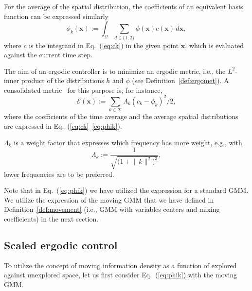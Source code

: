 \documentclass[letterpaper,10pt,conference,twoside]{IEEEtran}
\theoremstyle{definition}
\begin{document}
For the average of the spatial distribution, the coefficients of an equivalent basis function can be expressed similarly
\begin{equation}\label{eq:phik}
  \phi_k(\mathbf{x}):=\int_{\mathcal{Q}}{\sum_{d\in\{1,2\}}}{\phi(\mathbf{x})c(\mathbf{x})\,d\mathbf{x}},
\end{equation}
where $c$ is the integrand in Eq.~(\ref{eq:ck}) in the given point $\mathbf{x}$, which is evaluated against the current time step.

The aim of an ergodic controller is to minimize an ergodic metric, i.e., the $L^2$-inner product of the distributions $h$ and $\phi$ (see Definition~\ref{def:ergomet}). A consolidated metric~\cite{abraham2017ergodic,abraham2021ergodic,seewald2024energy,lerch2023safety,abraham2018decentralized,dong2023time} for this purpose is, for instance,
\begin{equation}
  \mathcal{E}(\mathbf{x}):=\sum_{k\in\mathcal{K}}{\Lambda_k(c_k-\phi_k)^2/2},
\end{equation}
where the coefficients of the time average and the average spatial distributions are expressed in Eq.~(\ref{eq:ck}--\ref{eq:phik}). 

$\Lambda_k$ is a weight factor that expresses which frequency has more weight, e.g., with %
\begin{equation}
  \Lambda_k:=\frac{1}{\sqrt{\big(1+\lVert{k}\rVert^2\big)^3}},
\end{equation}
lower frequencies are to be preferred.

Note that in Eq.~(\ref{eq:phik}) we have utilized the expression for a standard GMM. %
We utilize the expression of the moving GMM that we have defined in Definition~\ref{def:movement} (i.e., GMM with variables centers and mixing coefficients) in the next section.

\subsection{Scaled ergodic control}
\label{sec:sol}
\noindent
To utilize the concept of moving information density as a function of explored against unexplored space, let us first consider Eq.~(\ref{eq:phik}) with the moving GMM.
\end{document}
